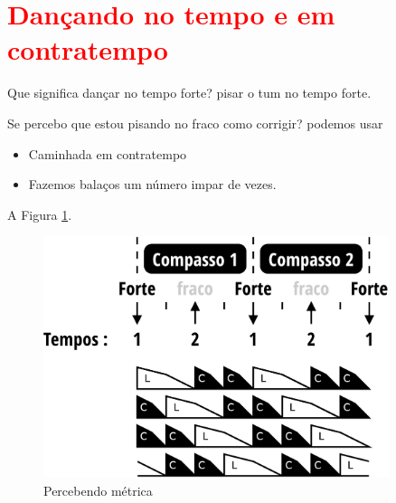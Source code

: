 
\section{\textcolor{red}{Dançando no tempo e em contratempo}}


Que significa dançar no tempo forte? 
pisar o tum  no tempo forte.

Se percebo que estou pisando no fraco como corrigir?
podemos usar
\begin{itemize}
\item Caminhada em contratempo
\item Fazemos balaços um número impar de vezes.
\end{itemize}


A Figura \ref{fig:tempovscontratempo}.

\begin{figure}[h]
    \centering 
\includegraphics[width=0.9\textwidth]{chapters/cap-musicalidade/bailarcontratempo.eps}
    \caption{Percebendo métrica}\label{fig:tempovscontratempo}
\end{figure}
